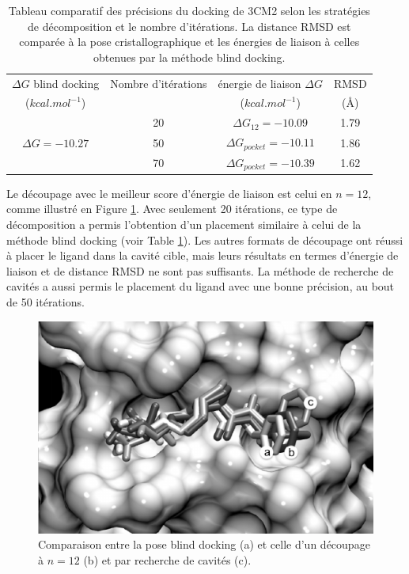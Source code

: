  \begin{table}
 	\begin{center}
 		\caption{Tableau comparatif des précisions du docking de 3CM2 selon les stratégies de décomposition et le nombre d'itérations. La distance RMSD est comparée à la pose cristallographique et les énergies de liaison à celles obtenues par la méthode blind docking.}\label{tab:rmsd}
 		\begin{tabular}{|c|c|c|c|}
 			\hline 
 			$\Delta G$ blind docking & Nombre d'itérations & énergie de liaison $\Delta G$ & RMSD  \\ 
 			($kcal.mol^{-1}$)  &  & ($kcal.mol^{-1}$) &  (\AA{}) \\
 			\hline 
 			\multirow{3}{*}{$\Delta G = -10.27$}  & 20 & $\Delta G_{12} = -10.09$ & 1.79 \\ \cline{2-4}
 			& 50 & $\Delta G_{pocket} = -10.11$ & 1.86 \\ \cline{2-4}
 			& 70 & $\Delta G_{pocket} = -10.39$ & 1.62 \\ \cline{2-4}
 			\hline 
 		\end{tabular} 
 	\end{center}
 \end{table}
 
Le découpage avec le meilleur score d'énergie de liaison est celui en $n = 12$, comme illustré en Figure \ref{fig:cuts}. Avec seulement 20 itérations, ce type de décomposition a permis l'obtention d'un placement similaire à celui de la méthode blind docking (voir Table \ref{tab:rmsd}). Les autres formats de découpage ont réussi à placer le ligand dans la cavité cible, mais leurs résultats en termes d'énergie de liaison et de distance RMSD ne sont pas suffisants. La méthode de recherche de cavités a aussi permis le placement du ligand avec une bonne précision, au bout de 50 itérations. 


 
 \begin{figure}[h]
 	\centering
 		\includegraphics[width=0.85\linewidth]{images/Romain/fig5-bw} 
 		\caption{Comparaison entre la pose blind docking (a) et celle d'un découpage à $n=12$ (b) et par recherche de cavités (c). }\label{fig:cuts} %
 \end{figure}

